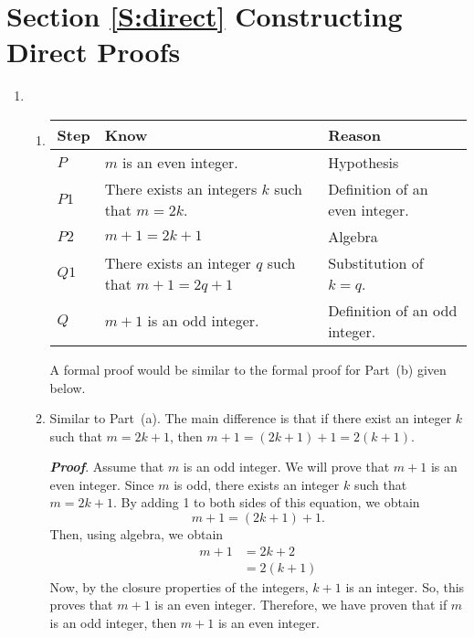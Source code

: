 \section*{Section \ref{S:direct} Constructing Direct Proofs}

\begin{enumerate}
\item \begin{enumerate}  \item 
\begin{tabular}[t]{|p{0.4in}|p{1.6in}|p{1.6in}|}
  \hline
  \textbf{Step}  &  \textbf{Know}  &  \textbf{Reason} \\ \hline
  $P$  &  $m$ is an even integer.  &  Hypothesis \\ \hline
  $P1$ &  There exists an integers $k$ such that $m = 2k$. &  Definition of an even integer. \\ \hline
  $P2$  &  $m + 1 = 2k + 1$  &  Algebra \\ \hline
  $Q1$  &  There exists an integer $q$ such that $m +1 = 2q+1$  &  Substitution of $k = q$. \\ \hline
  $Q$  &  $m + 1$ is an odd integer. &  Definition of an odd integer. \\ \hline
\end{tabular}

A formal proof would be similar to the formal proof for Part~(b) given below.

\item Similar to Part~(a).  The main difference is that if there exist an integer $k$ such that $m = 2k + 1$, then $m + 1 = \left(2k + 1 \right) + 1 = 2 \left( k + 1 \right)$.

\noindent
\emph{\textbf{Proof}}.  Assume that $m$ is an odd integer.  We will prove that $m + 1$ is an even integer.  Since 
$m$ is odd, there exists an integer $k$ such that $m = 2k + 1$.  By adding 1 to both sides of this equation, we obtain
\[
m + 1 = \left( 2k + 1 \right) + 1.
\]
Then, using algebra, we obtain
\[
\begin{aligned}
m + 1 &= 2k + 2 \\
      &= 2 \left( k + 1 \right)
\end{aligned}
\]
Now, by the closure properties of the integers, $k + 1$ is an integer.  So, this proves that 
$m + 1$ is an even integer.  Therefore, we have proven that if $m$ is an odd integer, then 
$m + 1$ is an even integer.
\end{enumerate}




\end{enumerate}
